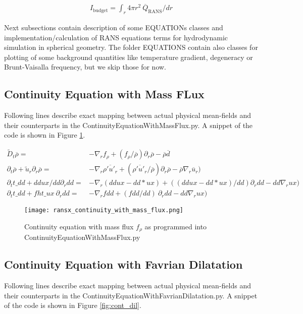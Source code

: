 \documentclass[11pt,paper=a4]{report}
\newcommand{\eht}{\overline}
\newcommand{\fht}{\widetilde}
\begin{document}
\begin{align}
  I_{\mbox{budget}} = \int_r 4 \pi r^2 \ \overline{Q}_{\mbox{RANS}} / dr
\label{eq:integralbudget}  
\end{align}

Next subsections contain description of some EQUATIONs classes and implementation/calculation of RANS equations terms for hydrodynamic simulation in spherical geometry.  The folder EQUATIONS contain also classes for plotting of some background quantities like temperature gradient, degeneracy or Brunt-Vaisalla frequency, but we skip those for now.

\subsection{Continuity Equation with Mass FLux}

Following lines describe exact mapping between actual physical mean-fields and their counterparts in the ContinuityEquationWithMassFlux.py. A snippet of the code is shown in Figure \ref{fig:cont_mass_flux}.

\begin{align}
  \fht{D}_t \eht{\rho} = & - \nabla_r f_\rho + (f_\rho / \eht{\rho})\partial_r \eht{\rho} - \eht{\rho}\eht{d} \\
  \partial_t \eht{\rho} + \fht{u}_r \partial_r \eht{\rho} = & -\nabla_r \eht{\rho'u'_r} + ( \eht{\rho'u'_r}/\eht{\rho})\partial_r \eht{\rho} - \eht{\rho} \nabla_r \eht{u}_r) \nonumber \\
  \partial_t t\_dd + ddux/dd \partial_r dd = & -\nabla_r (ddux - dd*ux) + ((ddux-dd*ux)/dd) \partial_r dd - dd \nabla_r ux) \nonumber  \\
  \partial_t t\_dd + fht\_ux \ \partial_r dd = & -\nabla_r fdd + (fdd/dd) \ \partial_r dd - dd \nabla_r ux) \nonumber   
\end{align}

\begin{figure}[!h]
\centerline{
\texttt{[image: ransx\_continuity\_with\_mass\_flux.png]}}
\caption{Continuity equation with mass flux $f_\rho$ as programmed into ContinuityEquationWithMassFlux.py}
\label{fig:cont_mass_flux}
\end{figure}

\subsection{Continuity Equation with Favrian Dilatation}

Following lines describe exact mapping between actual physical mean-fields and their counterparts in the ContinuityEquationWithFavrianDilatation.py. A snippet of the code is shown in Figure \ref{fig:cont_dil}.
\end{document}

